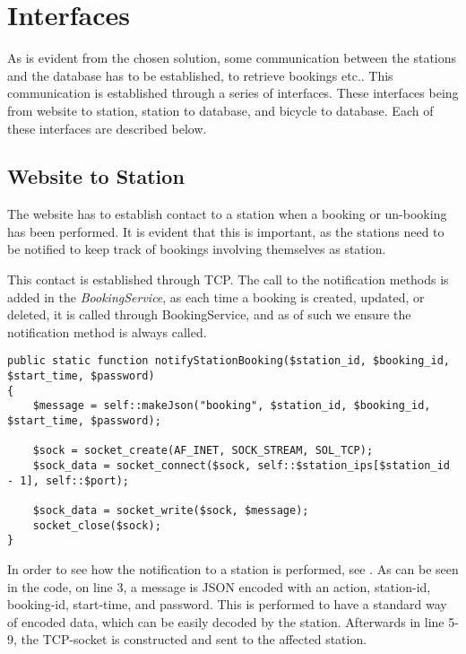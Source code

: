 \section{Interfaces}\label{sec:interfaces}
As is evident from the chosen solution, some communication between the stations and the database has to be established, to retrieve bookings etc..
This communication is established through a series of interfaces.
These interfaces being from website to station, station to database, and bicycle to database.
Each of these interfaces are described below.

\subsection{Website to Station}\label{sec:webToStationI}
The website has to establish contact to a station when a booking or un-booking has been performed.
It is evident that this is important, as the stations need to be notified to keep track of bookings involving themselves as station.

This contact is established through TCP.
The call to the notification methods is added in the \textit{BookingService}, as each time a booking is created, updated, or deleted, it is called through BookingService, and as of such we ensure the notification method is always called.

\begin{minipage}{\textwidth}
\begin{lstlisting}[caption = {Function for notifying a station of a new booking.}, label = {lst:notifystationbooking}]
public static function notifyStationBooking($station_id, $booking_id, $start_time, $password)
{
	$message = self::makeJson("booking", $station_id, $booking_id, $start_time, $password);
	
	$sock = socket_create(AF_INET, SOCK_STREAM, SOL_TCP);
	$sock_data = socket_connect($sock, self::$station_ips[$station_id - 1], self::$port);
	
	$sock_data = socket_write($sock, $message);
	socket_close($sock);
}
\end{lstlisting}
\end{minipage}

In order to see how the notification to a station is performed, see .
As can be seen in the code, on line 3, a message is JSON encoded with an action, station-id, booking-id, start-time, and password.
This is performed to have a standard way of encoded data, which can be easily decoded by the station.
Afterwards in line 5-9, the TCP-socket is constructed and sent to the affected station.

